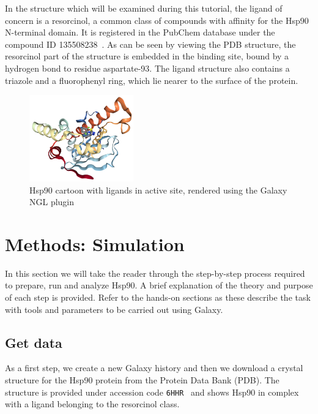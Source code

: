 \documentclass[twocolumn]{bmcart}%
\begin{document}
In the structure which will be examined during this tutorial, the ligand of concern is a resorcinol, a common class of compounds with affinity for the Hsp90 N-terminal domain. It is registered in the PubChem database under the compound ID 135508238~\cite{ligand_resorcinol}. As can be seen by viewing the PDB structure, the resorcinol part of the structure is embedded in the binding site, bound by a hydrogen bond to residue aspartate-93. The ligand structure also contains a triazole and a fluorophenyl ring, which lie nearer to the surface of the protein.

\begin{figure}[ht!]
  \includegraphics[width=0.4\textwidth]{hsp90lig}
    \caption{
    Hsp90 cartoon with ligands in active site, rendered using the Galaxy NGL plugin~\cite{Rose2018ngl}}
\label{fig:Hsp90}
 \end{figure}

\hypertarget{methods}{%
\section*{Methods: Simulation}\label{methods}}
In this section we will take the reader through the step-by-step process required to prepare, run and analyze Hsp90. A brief explanation of the theory and purpose of each step is provided. Refer to the hands-on sections as these describe the task with tools and parameters to be carried out using Galaxy. 


\subsection*{Get data}\label{get-data}

As a first step, we create a new Galaxy history and then we download a crystal structure for the Hsp90 protein from the Protein Data Bank (PDB). The structure is provided under accession code \texttt{6HHR}~\cite{Schuetz2018} and shows Hsp90 in complex with a ligand belonging to the resorcinol class.
\end{document}

